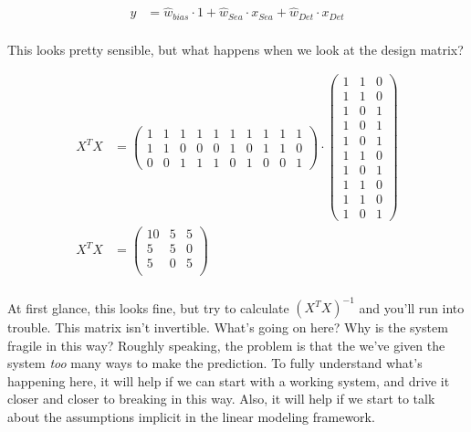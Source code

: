 \begin{align}
y &= \hat{w}_\mathit{bias} \cdot 1 
     + \hat{w}_\mathit{Sea} \cdot x_\mathit{Sea}
     + \hat{w}_\mathit{Det} \cdot x_\mathit{Det}\\
\end{align}

This looks pretty sensible, but what happens when we look at the design matrix?

\begin{align}
X^T X &=
\left(\begin{array}{cccccccccc}
          1 & 1 & 1 & 1 & 1 & 1 & 1 & 1 & 1 & 1 \\
          1 & 1 & 0 & 0 & 0 & 1 & 0 & 1 & 1 & 0 \\
          0 & 0 & 1 & 1 & 1 & 0 & 1 & 0 & 0 & 1
\end{array}\right)
\cdot
\left(\begin{array}{ccc}
     1  &  1  &  0 \\ 
     1  &  1  &  0 \\ 
     1  &  0  &  1 \\ 
     1  &  0  &  1 \\ 
     1  &  0  &  1 \\ 
     1  &  1  &  0 \\ 
     1  &  0  &  1 \\ 
     1  &  1  &  0 \\ 
     1  &  1  &  0 \\ 
     1  &  0  &  1
\end{array}\right)
\\
X^T X &=
\left(\begin{array}{ccc}
      10 & 5 & 5 \\
       5 & 5 & 0 \\
       5 & 0 & 5 \\
\end{array}\right)
\end{align}
\\
At first glance, this looks fine, but try to calculate $(X^T X)^{-1}$ and you'll
run into trouble. This matrix isn't invertible.  What's going on here? Why is
the system fragile in this way? Roughly speaking, the problem is that the we've
given the system \emph{too} many ways to make the prediction.  To fully
understand what's happening here, it will help if we can start with a working
system, and drive it closer and closer to breaking in this way.  Also, it will
help if we start to talk about the assumptions implicit in the linear modeling
framework.

